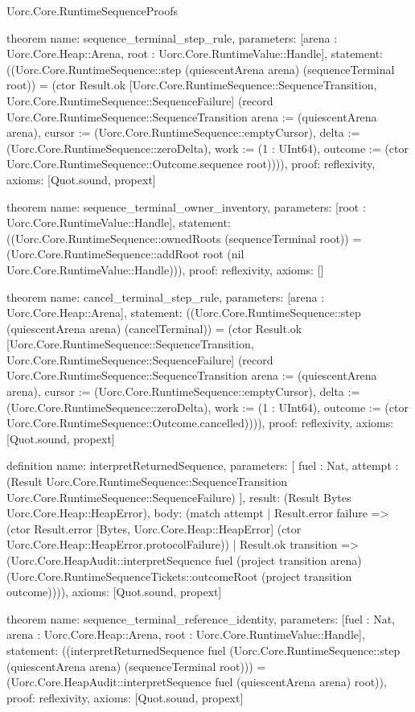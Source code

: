\begin{lexlean}{Uorc.Core.RuntimeSequenceProofs}
\begin{semanticmodule}
theorem{
  name: sequence_terminal_step_rule,
  parameters: [arena : Uorc.Core.Heap::Arena, root : Uorc.Core.RuntimeValue::Handle],
  statement: ((Uorc.Core.RuntimeSequence::step (quiescentArena arena) (sequenceTerminal root)) = (ctor Result.ok [Uorc.Core.RuntimeSequence::SequenceTransition, Uorc.Core.RuntimeSequence::SequenceFailure] (record Uorc.Core.RuntimeSequence::SequenceTransition {arena := (quiescentArena arena), cursor := (Uorc.Core.RuntimeSequence::emptyCursor), delta := (Uorc.Core.RuntimeSequence::zeroDelta), work := (1 : UInt64), outcome := (ctor Uorc.Core.RuntimeSequence::Outcome.sequence root)}))),
  proof: reflexivity{},
  axioms: [Quot.sound, propext]
}

theorem{
  name: sequence_terminal_owner_inventory,
  parameters: [root : Uorc.Core.RuntimeValue::Handle],
  statement: ((Uorc.Core.RuntimeSequence::ownedRoots (sequenceTerminal root)) = (Uorc.Core.RuntimeSequence::addRoot root (nil Uorc.Core.RuntimeValue::Handle))),
  proof: reflexivity{},
  axioms: []
}

theorem{
  name: cancel_terminal_step_rule,
  parameters: [arena : Uorc.Core.Heap::Arena],
  statement: ((Uorc.Core.RuntimeSequence::step (quiescentArena arena) (cancelTerminal)) = (ctor Result.ok [Uorc.Core.RuntimeSequence::SequenceTransition, Uorc.Core.RuntimeSequence::SequenceFailure] (record Uorc.Core.RuntimeSequence::SequenceTransition {arena := (quiescentArena arena), cursor := (Uorc.Core.RuntimeSequence::emptyCursor), delta := (Uorc.Core.RuntimeSequence::zeroDelta), work := (1 : UInt64), outcome := (ctor Uorc.Core.RuntimeSequence::Outcome.cancelled)}))),
  proof: reflexivity{},
  axioms: [Quot.sound, propext]
}

definition{
  name: interpretReturnedSequence,
  parameters: [
    fuel : Nat,
    attempt : (Result Uorc.Core.RuntimeSequence::SequenceTransition Uorc.Core.RuntimeSequence::SequenceFailure)
  ],
  result: (Result Bytes Uorc.Core.Heap::HeapError),
  body: (match attempt
    | Result.error failure => (ctor Result.error [Bytes, Uorc.Core.Heap::HeapError] (ctor Uorc.Core.Heap::HeapError.protocolFailure))
    | Result.ok transition => (Uorc.Core.HeapAudit::interpretSequence fuel (project transition arena) (Uorc.Core.RuntimeSequenceTickets::outcomeRoot (project transition outcome)))),
  axioms: [Quot.sound, propext]
}

theorem{
  name: sequence_terminal_reference_identity,
  parameters: [fuel : Nat, arena : Uorc.Core.Heap::Arena, root : Uorc.Core.RuntimeValue::Handle],
  statement: ((interpretReturnedSequence fuel (Uorc.Core.RuntimeSequence::step (quiescentArena arena) (sequenceTerminal root))) = (Uorc.Core.HeapAudit::interpretSequence fuel (quiescentArena arena) root)),
  proof: reflexivity{},
  axioms: [Quot.sound, propext]
}


\end{semanticmodule}
\end{lexlean}
